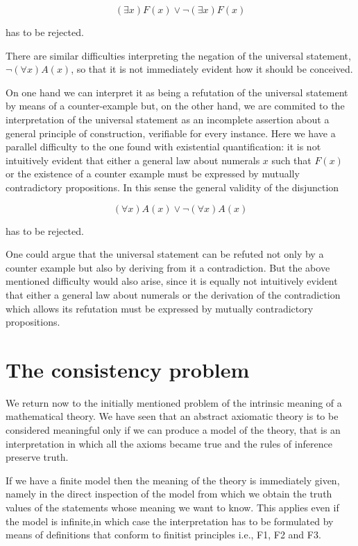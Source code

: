 \documentclass[12pt]{article}
\begin{document}
$$(\exists x) F (x) \vee \neg (\exists x) F (x)$$
 
has to be rejected.

There are similar difficulties interpreting the negation of the universal statement, $\neg (\forall x) A (x)$, so that it is not immediately evident how it should be conceived.

On one hand we can interpret it as being a refutation of the universal statement by means of a counter-example but, on the other hand, we are commited to the interpretation of the universal statement as an incomplete assertion about a general principle of construction, verifiable for every instance. Here we have a parallel difficulty to the one found with existential quantification: it is not intuitively evident that either a general law about numerals $x$ such that $F (x)$ or the existence of a counter example must be expressed by mutually contradictory propositions. In this sense the general validity of the disjunction

$$(\forall x) A (x) \vee \neg (\forall x) A (x)$$
 
has to be rejected.

One could argue that the universal statement can be refuted not only by a counter example but also by deriving from it a contradiction. But the above mentioned difficulty would also arise, since it is equally not intuitively evident that either a general law about numerals or the derivation of the contradiction which allows its refutation must be expressed by mutually contradictory propositions.

\section{The consistency problem}\normalsize

We return now to the initially mentioned problem of the intrinsic meaning of a mathematical theory. We have seen that an abstract axiomatic theory is to be considered meaningful only if we can produce a model of the theory, that is an interpretation in which all the axioms became true and the rules of inference preserve truth.

If we have a finite model then the meaning of the theory is immediately given, namely in the direct inspection of the model from which we obtain the truth values of the statements whose meaning we want to know. This applies even if the model is infinite,in which case the interpretation has to be formulated by means of definitions that conform to    finitist principles i.e., F1, F2 and F3.
\end{document}
